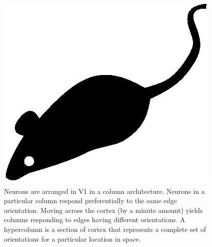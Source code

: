 \begin{figure}[tp]
\centering
\includegraphics{./fig/acmlarge-mouse}
\caption{Neurons are arranged in V1 in a column architecture. Neurons
in a particular column respond preferentially to the same edge
orientation. Moving across the cortex (by a minute amount) yields
columns responding to edges having different orientations. A
hypercolumn is a section of cortex that represents a complete set of
orientations for a particular location in space.}
\label{corticalarchitecturefig}
\end{figure}
